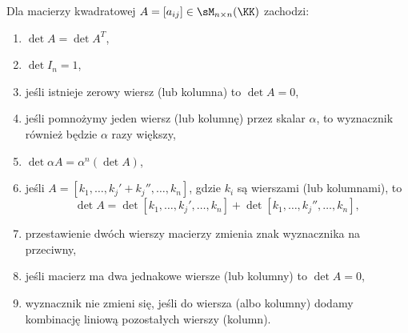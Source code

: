 \begin{theorem}
    \label{t:determinant properties}
    Dla macierzy kwadratowej $A = [a_{ij}] \in \sM_{n\times n}(\KK)$ zachodzi:
    \begin{enumerate}
        \item $\det A = \det A^T$,
        \item $\det I_n = 1$,
        \item jeśli istnieje zerowy wiersz (lub kolumna) to $\det A = 0$,
        \item jeśli pomnożymy jeden wiersz (lub kolumnę) przez skalar $\alpha$, to wyznacznik również będzie $\alpha$ razy większy,
        \item $\det \alpha A = \alpha^n(\det A)$,
        \item \label{t:p:determinant of a matrix with sum} jeśli $A = [k_1, \ldots, k_j' + k_j'', \ldots, k_n]$, gdzie $k_i$ są wierszami (lub kolumnami), to
              \[ \det A = \det [k_1, \ldots, k_j', \ldots, k_n] + \det [k_1, \ldots, k_j'', \ldots, k_n], \]
        \item przestawienie dwóch wierszy macierzy zmienia znak wyznacznika na przeciwny,
        \item \label{t:p:determinant of a matrix with same rows} jeśli macierz ma dwa jednakowe wiersze (lub kolumny) to $\det A = 0$,
        \item wyznacznik nie zmieni się, jeśli do wiersza (albo kolumny) dodamy kombinację liniową pozostałych wierszy (kolumn).
    \end{enumerate}
\end{theorem}
